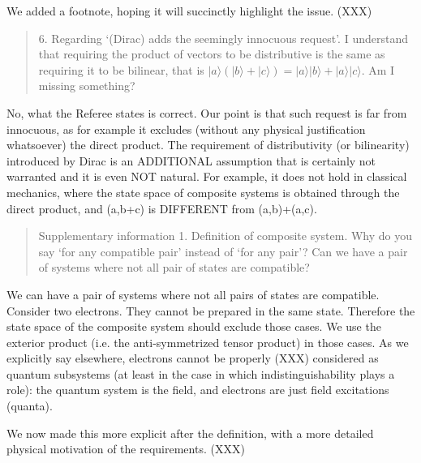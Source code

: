 \documentclass[11pt]{article}
\def\>{\rangle}
\begin{document}
We added a footnote, hoping it will succinctly highlight
the issue. (XXX)

\begin{quote}
6. Regarding `(Dirac) adds the seemingly innocuous
request'. I understand that requiring the product of vectors to be
distributive is the same as requiring it to be bilinear, that is $|a\>
(|b\> + |c\>) = |a\>|b\> + |a\>|c\>$. Am I missing something?
\end{quote}

No, what the Referee states is correct. Our point is that such request
is far from innocuous, as for example it excludes (without any
physical justification whatsoever) the direct product. The requirement
of distributivity (or bilinearity) introduced by Dirac is an
ADDITIONAL assumption that is certainly not warranted and it is even
NOT natural. For example, it does not hold in classical mechanics,
where the state space of composite systems is obtained through the
direct product, and (a,b+c) is DIFFERENT from (a,b)+(a,c).

\begin{quote}
Supplementary information 1. Definition of composite
system. Why do you say `for any compatible pair' instead of `for any
pair'? Can we have a pair of systems where not all pair of states are
compatible?
\end{quote}

We can have a pair of systems where not all pairs of states are
compatible. Consider two electrons. They cannot be prepared in the
same state. Therefore the state space of the composite system should
exclude those cases. We use the exterior product (i.e. the
anti-symmetrized tensor product) in those cases. As we explicitly say
elsewhere, electrons cannot be properly (XXX) considered as quantum
subsystems (at least in the case in which indistinguishability plays a
role): the quantum system is the field, and electrons are just field
excitations (quanta).

We now made this more explicit after the definition, with a more detailed physical motivation of the requirements. (XXX)
\end{document}
